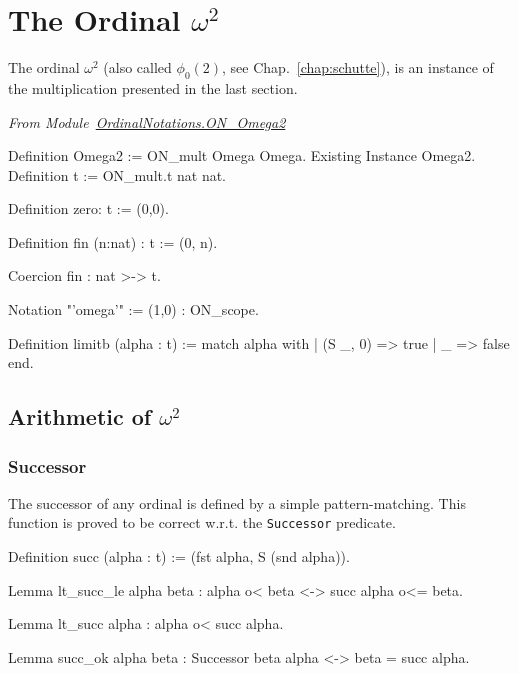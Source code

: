 \section{The Ordinal \texorpdfstring{$\omega^2$}{omega2}}

The ordinal $\omega^2$ (also called $\phi_0(2)$, see Chap.~\ref{chap:schutte}), is an instance of the multiplication presented in the last section.

\vspace{4pt}
\noindent\emph{From Module~\href{../theories/html/hydras.OrdinalNotations.ON_Omega2.html}{OrdinalNotations.ON\_Omega2}}

\begin{Coqsrc}
Definition Omega2 := ON_mult Omega Omega.
Existing Instance Omega2.
Definition t := ON_mult.t nat nat.
\end{Coqsrc}



\begin{Coqsrc}
Definition zero: t := (0,0).

Definition fin (n:nat) : t := (0, n).

Coercion fin : nat >-> t.

Notation "'omega'" := (1,0) : ON_scope.

Definition limitb (alpha : t) := 
 match alpha with
 |  (S _, 0) => true
 | _ => false
end.
\end{Coqsrc}




\subsection{Arithmetic of \texorpdfstring{$\omega^2$}{omega^2}} 

\subsubsection{Successor}

The successor of any ordinal is defined by a simple pattern-matching.
This function is proved to be correct w.r.t. the \texttt{Successor} predicate.

\begin{Coqsrc}
Definition succ (alpha : t) := (fst alpha, S (snd alpha)).
\end{Coqsrc}

\begin{Coqsrc}
Lemma lt_succ_le alpha beta : alpha o< beta <-> succ alpha o<= beta.

Lemma lt_succ alpha : alpha o< succ alpha.

Lemma succ_ok alpha beta : Successor beta alpha <-> beta = succ alpha.
\end{Coqsrc}

